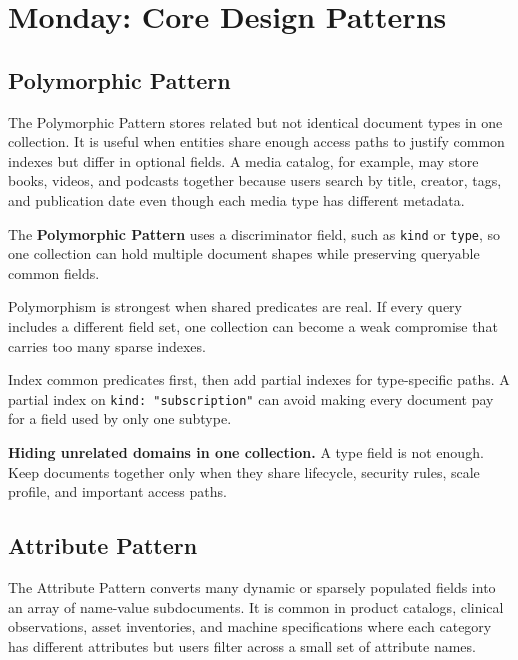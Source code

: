 \section{Monday: Core Design Patterns}
\subsection{Polymorphic Pattern}
The Polymorphic Pattern stores related but not identical document types in one collection. It is useful when entities share enough access paths to justify common indexes but differ in optional fields. A media catalog, for example, may store books, videos, and podcasts together because users search by title, creator, tags, and publication date even though each media type has different metadata.

\begin{definitionbox}
The \textbf{Polymorphic Pattern} uses a discriminator field, such as \texttt{kind} or \texttt{type}, so one collection can hold multiple document shapes while preserving queryable common fields.
\end{definitionbox}

\begin{notebox}
Polymorphism is strongest when shared predicates are real. If every query includes a different field set, one collection can become a weak compromise that carries too many sparse indexes.
\end{notebox}

\begin{tipbox}
Index common predicates first, then add partial indexes for type-specific paths. A partial index on \texttt{kind: "subscription"} can avoid making every document pay for a field used by only one subtype.
\end{tipbox}

\begin{pitfall}
\textbf{Hiding unrelated domains in one collection.} A type field is not enough. Keep documents together only when they share lifecycle, security rules, scale profile, and important access paths.
\end{pitfall}

\subsection{Attribute Pattern}
The Attribute Pattern converts many dynamic or sparsely populated fields into an array of name-value subdocuments. It is common in product catalogs, clinical observations, asset inventories, and machine specifications where each category has different attributes but users filter across a small set of attribute names.


